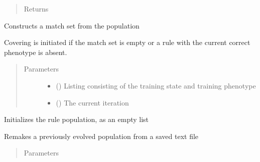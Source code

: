 \documentclass[letterpaper,10pt,english]{sphinxmanual}
\begin{document}
\begin{fulllineitems}
\begin{fulllineitems}
\begin{quote}
\begin{description}
\item[{Returns}] \leavevmode


\end{description}\end{quote}

\end{fulllineitems}


\begin{fulllineitems}
\label{\detokenize{eLCS:eLCS.ClassifierSet.ClassifierSet.makeMatchSet}}
Constructs a match set from the population

Covering is initiated if the match set is empty or a rule with the current correct phenotype is absent.
\begin{quote}\begin{description}
\item[{Parameters}] \leavevmode\begin{itemize}
\item {} 
 () \textendash{} Listing consisting of the training state and training phenotype

\item {} 
 () \textendash{} The current iteration

\end{itemize}

\end{description}\end{quote}

\end{fulllineitems}


\begin{fulllineitems}
\label{\detokenize{eLCS:eLCS.ClassifierSet.ClassifierSet.makePop}}
Initializes the rule population, as an empty list

\end{fulllineitems}


\begin{fulllineitems}
\label{\detokenize{eLCS:eLCS.ClassifierSet.ClassifierSet.rebootPop}}
Remakes a previously evolved population from a saved text file
\begin{quote}\begin{description}
\item[{Parameters}] \leavevmode
{} \textendash{} 


\end{description}
\end{quote}
\end{fulllineitems}
\end{fulllineitems}
\end{document}
